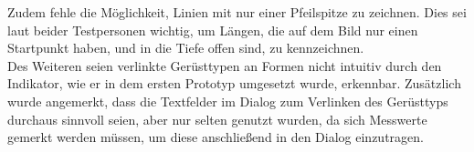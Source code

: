 Zudem fehle die Möglichkeit, Linien mit nur einer Pfeilspitze zu zeichnen.
Dies sei laut beider Testpersonen wichtig, um Längen, die auf dem Bild nur einen Startpunkt haben, und in die Tiefe offen sind, zu kennzeichnen. \\

Des Weiteren seien verlinkte Gerüsttypen an Formen nicht intuitiv durch den Indikator, wie er in dem ersten Prototyp umgesetzt wurde, erkennbar.
Zusätzlich wurde angemerkt, dass die Textfelder im Dialog zum Verlinken des Gerüsttyps durchaus sinnvoll seien, aber nur selten genutzt wurden, da sich Messwerte gemerkt werden müssen, um diese anschließend in den Dialog einzutragen. \\
